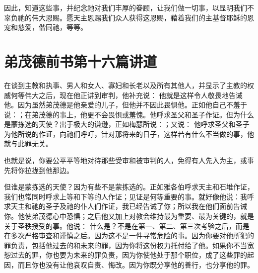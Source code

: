 因此，知道这些事，并纪念祂对我们丰厚的眷顾，让我们做一切事，以显明我们不辜负祂的伟大恩赐。愿天主恩赐我们众人获得这恩赐，藉着我们的主基督耶稣的恩宠和慈爱，偕同祂，等等。\par



\section{弟茂德前书第十六篇讲道}

\par

\par

在谈到主教和执事、男人和女人、寡妇和长老以及所有其他人，并显示了主教的权威何等伟大之后，现在他正讲到审判，他补充说： 他就是这样令人敬畏地告诫他。因为虽然弟茂德是他亲爱的儿子，但他并不因此畏惧他。正如他自己不羞于说：；在弟茂德的事上，他更不会畏惧或羞愧。他呼求圣父和圣子作证。但为什么是蒙拣选的天使？出于极大的谦逊，正如梅瑟所说：；又说： 他呼求圣父和圣子为他所说的作证，向祂们呼吁，针对那将来的日子，这样若有什么不当做的事，他就与此罪无关。\par

 也就是说，你要公平平等地对待那些受审和被审判的人，免得有人先入为主，或事先将你拉拢到他那边。\par

但谁是蒙拣选的天使？因为有些不是蒙拣选的。正如雅各伯呼求天主和石堆作证，我们也常同时呼求上等和下等的人作证；见证是何等重要的事。就好像他说：我呼求天主和祂的圣子及祂的仆人们作证，我已经告诫了你；所以我在他们面前告诫你。他使弟茂德心中恐惧；之后他又加上对教会维持最为重要、最为关键的，就是关于圣秩授受的事。他说： 什么是？不是在第一、第二、第三次考验之后，而是在多次严格审查和谨慎之后。因为这不是一件寻常危险的事。因为你要对他所犯的罪负责，包括他过去的和未来的罪，因为你将这份权力托付给了他。如果你不当宽恕过去的罪，你也要为未来的罪负责，因为你使他处于那个职位，成了这些罪的起因，而且你也没有让他哀叹自责、悔改。因为你既分享他的善行，也分享他的罪。\par

